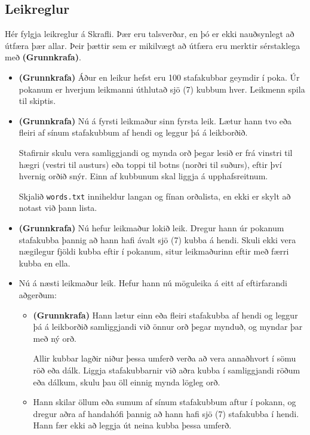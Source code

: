 \documentclass[12pt,a4paper]{article}
\newcommand{\coref}{\textbf{(Grunnkrafa)}}
\begin{document}
\subsection*{Leikreglur}

Hér fylgja leikreglur á Skrafli. Þær eru talsverðar, en þó er ekki nauðsynlegt að útfæra þær allar. Þeir þættir sem er mikilvægt að útfæra eru merktir sérstaklega með \coref{}.

\begin{itemize}

	\item \coref{} Áður en leikur hefst eru 100 stafakubbar geymdir í poka. Úr pokanum er hverjum leikmanni úthlutað sjö (7) kubbum hver. Leikmenn spila til skiptis.

	\item \coref{} Nú á fyrsti leikmaður sinn fyrsta leik. Lætur hann tvo eða fleiri af sínum stafakubbum af hendi og leggur þá á leikborðið.

	Stafirnir skulu vera samliggjandi og mynda orð þegar lesið er frá vinstri til hægri (vestri til austurs) eða toppi til botns (norðri til suðurs), eftir því hvernig orðið snýr. Einn af kubbunum skal liggja á upphafsreitnum.

	Skjalið \texttt{words.txt} inniheldur langan og fínan orðalista, en ekki er skylt að notast við þann lista.

	\item \coref{} Nú hefur leikmaður lokið leik. Dregur hann úr pokanum stafakubba þannig að hann hafi ávalt sjö (7) kubba á hendi. Skuli ekki vera nægilegur fjöldi kubba eftir í pokanum, situr leikmaðurinn eftir með færri kubba en ella.

	\item Nú á næsti leikmaður leik. Hefur hann nú möguleika á eitt af eftirfarandi aðgerðum:
	\begin{itemize}
		\item \coref{} Hann lætur einn eða fleiri stafakubba af hendi og leggur þá á leikborðið samliggjandi við önnur orð þegar mynduð, og myndar þar með ný orð.

		Allir kubbar lagðir niður þessa umferð verða að vera annaðhvort í sömu röð eða dálk. Liggja stafakubbarnir við aðra kubba í samliggjandi röðum eða dálkum, skulu þau öll einnig mynda lögleg orð.

		\item Hann skilar öllum eða sumum af sínum stafakubbum aftur í pokann, og dregur aðra af handahófi þannig að hann hafi sjö (7) stafakubba í hendi. Hann fær ekki að leggja út neina kubba þessa umferð.


\end{itemize}
\end{itemize}
\end{document}
